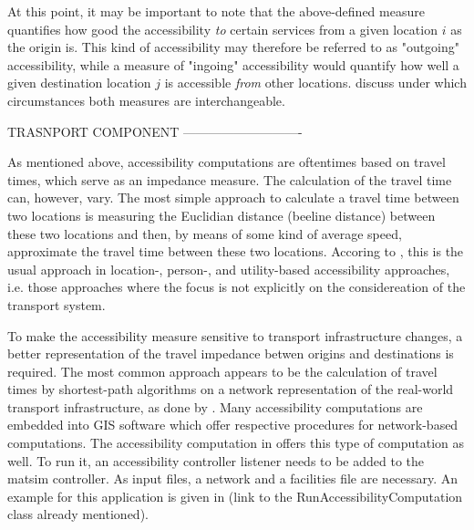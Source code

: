 At this point, it may be important to note that the above-defined measure quantifies how good the accessibility \textit{to} certain services from a given location $i$ as the origin is. This kind of accessibility may therefore be referred to as "outgoing" accessibility, while a measure of "ingoing" accessibility would quantify how well a given destination location $j$ is accessible \textit{from} other locations. \citet{NicolaiNagel2012HiResAccessibilityMethodInBook} discuss under which circumstances both measures are interchangeable.

TRASNPORT COMPONENT ----------------------------


As mentioned above, accessibility computations are oftentimes based on travel times, which serve as an impedance measure. The calculation of the travel time can, however, vary. The most simple approach to calculate a travel time between two locations is measuring the Euclidian distance (beeline distance) between these two locations and then, by means of some kind of average speed, approximate the travel time between these two locations. Accoring to \citet{Geurs2004AccessibilityReview}, this is the usual approach in location-, person-, and utility-based accessibility approaches, i.e. those approaches where the focus is not explicitly on the considereation of the transport system.

To make the accessibility measure sensitive to transport infrastructure changes, a better representation of the travel impedance betwen origins and destinations is required. The most common approach appears to be the calculation of travel times by shortest-path algorithms on a network representation of the real-world transport infrastructure, as \eg done by \citet{BBSR20xxErreichbarkeitsmodell}.
Many accessibility computations are embedded into GIS software which offer respective procedures for network-based computations. The accessibility computation in  offers this type of computation as well. To run it, an accessibility controller listener needs to be added to the \gls{matsim} controller. As input files, a network and a facilities file are necessary. An example for this application is given in (link to the RunAccessibilityComputation class already mentioned).

